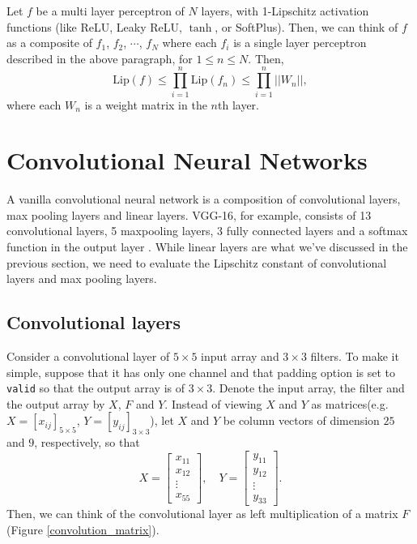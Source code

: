 \documentclass[12pt]{report}
\numberwithin{figure}{chapter}
\theoremstyle{plain}
\theoremstyle{definition}
\theoremstyle{corollary}
\theoremstyle{definition}
\theoremstyle{plain}
\theoremstyle{definition}
\theoremstyle{plain}
\newcommand\lip{\ensuremath{\text{Lip}}}
\begin{document}
Let \(f\) be a multi layer perceptron of \(N\) layers, with 1-Lipschitz activation functions (like ReLU, Leaky ReLU, \(\tanh\), or SoftPlus).
Then, we can think of \(f\) as a composite of \(f_1\), \(f_2\), \(\cdots\), \(f_N\) where each \(f_i\) is a single layer perceptron described in the above paragraph, for \(1\le n\le N\).
Then,
\[\lip(f)\le\prod_{i=1}^n\lip(f_n)\le\prod_{i=1}^n||W_n||,\]
where each \(W_n\) is a weight matrix in the \(n\)th layer.

\section{Convolutional Neural Networks}

A vanilla convolutional neural network is a composition of convolutional layers, max pooling layers and linear layers.
VGG-16, for example, consists of 13 convolutional layers, 5 maxpooling layers, 3 fully connected layers and a softmax function in the output layer \cite{SK-ZA}.
While linear layers are what we've discussed in the previous section, we need to evaluate the Lipschitz constant of convolutional layers and max pooling layers.

\subsection{Convolutional layers}\label{convolutional_layers}
Consider a convolutional layer of \(5\times 5\) input array and \(3\times 3\) filters.
To make it simple, suppose that it has only one channel and that padding option is set to \texttt{valid} so that the output array is of \(3\times 3\).
Denote the input array, the filter and the output array by \(X\), \(F\) and \(Y\).
Instead of viewing \(X\) and \(Y\) as matrices(e.g. \(X=[x_{ij}]_{5\times 5}\), \(Y=[y_{ij}]_{3\times 3}\)), let \(X\) and \(Y\) be column vectors of dimension \(25\) and \(9\), respectively, so that
\[X=\begin{bmatrix}x_{11}\\x_{12}\\\vdots\\x_{55}\end{bmatrix},\quad
Y=\begin{bmatrix}y_{11}\\y_{12}\\\vdots\\y_{33}\end{bmatrix}.\]
Then, we can think of the convolutional layer as left multiplication of a matrix \(F\) (Figure \ref{convolution_matrix}).
\end{document}
